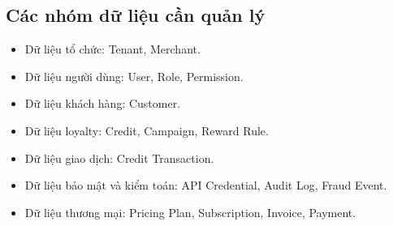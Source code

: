 \subsection{Các nhóm dữ liệu cần quản lý}

\begin{itemize}
    \item Dữ liệu tổ chức: Tenant, Merchant.
    \item Dữ liệu người dùng: User, Role, Permission.
    \item Dữ liệu khách hàng: Customer.
    \item Dữ liệu loyalty: Credit, Campaign, Reward Rule.
    \item Dữ liệu giao dịch: Credit Transaction.
    \item Dữ liệu bảo mật và kiểm toán: API Credential, Audit Log, Fraud Event.
    \item Dữ liệu thương mại: Pricing Plan, Subscription, Invoice, Payment.
\end{itemize}
